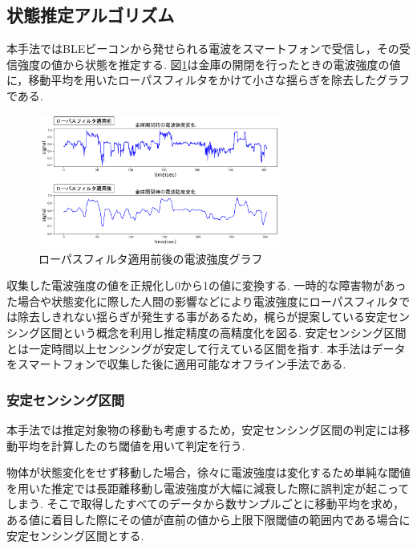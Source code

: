 \documentclass[Japanese]{dicomopapers}
\begin{document}
\subsection{状態推定アルゴリズム}
本手法ではBLEビーコンから発せられる電波をスマートフォンで受信し，その受信強度の値から状態を推定する.
図\ref{bank-opcl}は金庫の開閉を行ったときの電波強度の値に，移動平均を用いたローパスフィルタをかけて小さな揺らぎを除去したグラフである.

\begin{figure}[t]
 \centering
 \includegraphics[width=8cm]{lowpath_compare.png}
 \caption{ローパスフィルタ適用前後の電波強度グラフ}
 \label{bank-opcl}
\end{figure}

収集した電波強度の値を正規化し0から1の値に変換する.
一時的な障害物があった場合や状態変化に際した人間の影響などにより電波強度にローパスフィルタでは除去しきれない揺らぎが発生する事があるため，梶ら\cite{sensing-area}が提案している安定センシング区間という概念を利用し推定精度の高精度化を図る.
安定センシング区間とは一定時間以上センシングが安定して行えている区間を指す.
本手法はデータをスマートフォンで収集した後に適用可能なオフライン手法である.


\subsubsection{安定センシング区間}
本手法では推定対象物の移動も考慮するため，安定センシング区間の判定には移動平均を計算したのち閾値を用いて判定を行う.





物体が状態変化をせず移動した場合，徐々に電波強度は変化するため単純な閾値を用いた推定では長距離移動し電波強度が大幅に減衰した際に誤判定が起こってしまう.
そこで取得したすべてのデータから数サンプルごとに移動平均を求め，ある値に着目した際にその値が直前の値から上限下限閾値の範囲内である場合に安定センシング区間とする.
\end{document}
